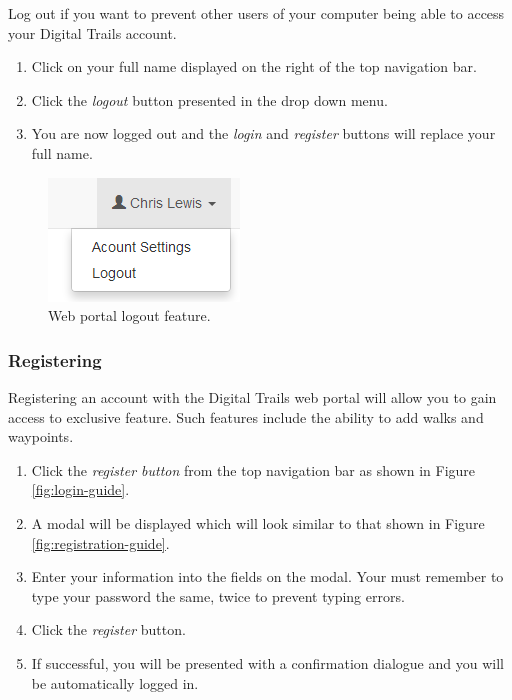 \documentclass[11pt,a4paper]{report}
\begin{document}
Log out if you want to prevent other users of your computer being able to access your Digital Trails account.

\begin{enumerate}
\item Click on your full name displayed on the right of the top navigation bar.
\item Click the \emph{logout} button presented in the drop down menu.
\item You are now logged out and the \emph{login} and \emph{register} buttons will replace your full name.
\end{enumerate}

\begin{figure}[h]
\centering
\includegraphics[width=0.4\linewidth]{./img/webportal-guide/logout}
\caption{Web portal logout feature.}
\label{fig:logout}
\end{figure}

\subsubsection{Registering}

Registering an account with the Digital Trails web portal will allow you to gain access to exclusive feature. Such features include the ability to add walks and waypoints.

\begin{enumerate}
\item Click the \emph{register button} from the top navigation bar as shown in Figure \ref{fig:login-guide}.
\item A modal will be displayed which will look similar to that shown in Figure \ref{fig:registration-guide}.
\item Enter your information into the fields on the modal. Your must remember to type your password the same, twice to prevent typing errors.
\item Click the \emph{register} button.
\item If successful, you will be presented with a confirmation dialogue and you will be automatically logged in.
\end{enumerate}
\end{document}
